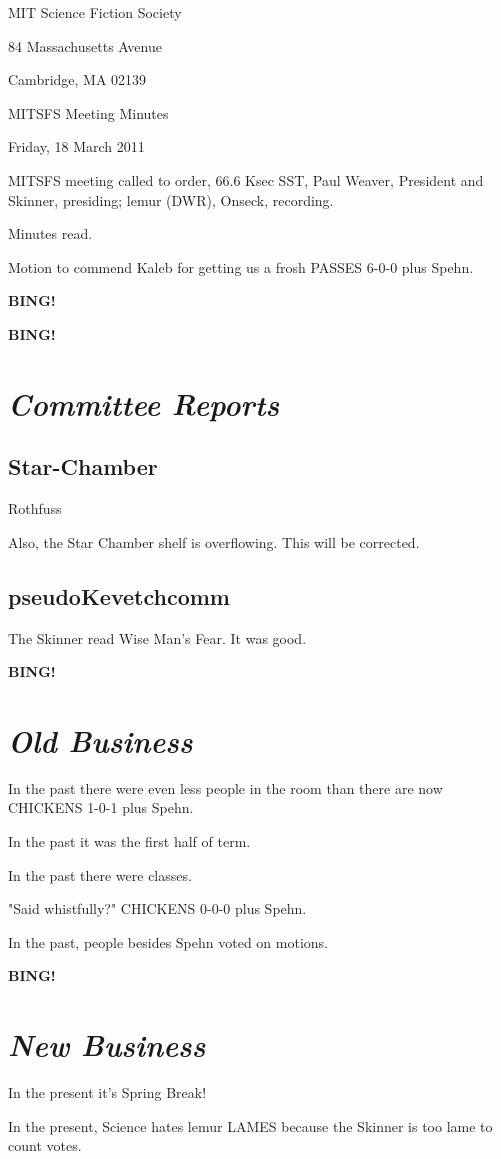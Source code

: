 \documentclass[10pt]{article}
\newcommand{\bing}{{\bf BING!} }
\newcommand{\goto}[1]{\bing \vskip 12pt \section*{{\em{#1}}}}
\newcommand{\ps}{ plus Spehn\xspace}
\newcommand{\skinner}{Paul Weaver, President and Skinner}
\newcommand{\onseck}{lemur (DWR), Onseck}
\newcommand{\meetingdate}{Friday, 18 March 2011}
\begin{document}
\begin{center}

MIT Science Fiction Society

84 Massachusetts Avenue

Cambridge, MA 02139

\vspace{12pt}

MITSFS Meeting Minutes

\meetingdate

\end{center}

\vspace{18pt}

\setlength{\parskip}{6pt}

\noindent
MITSFS meeting called to order, 66.6 Ksec SST,
\skinner, presiding; \onseck, recording.

Minutes read.

Motion to commend Kaleb for getting us a frosh PASSES 6-0-0\ps.

\bing

\goto{Committee Reports}

\subsection*{Star-Chamber}

Rothfuss

Also, the Star Chamber shelf is overflowing.  This will be
corrected.

\subsection*{pseudoKevetchcomm}

The Skinner read Wise Man's Fear.  It was good.


\goto{Old Business}

In the past there were even less people in the room than
there are now CHICKENS 1-0-1\ps.

In the past it was the first half of term.

In the past there were classes.

"Said whistfully?" CHICKENS 0-0-0\ps.

In the past, people besides Spehn voted on motions.


\goto{New Business}

In the present it's Spring Break!

In the present, Science hates lemur LAMES because
the Skinner is too lame to count votes.
\end{document}
